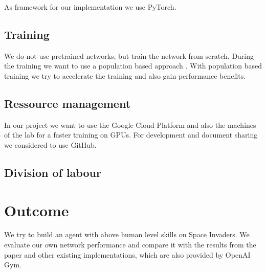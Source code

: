 \documentclass[10pt,twocolumn,letterpaper]{article}
\begin{document}
As framework for our implementation we use PyTorch.

\subsection{Training}
We do not use pretrained networks, but train the network from scratch. During the training we want to use a population based approach \cite{Jaderberg2017}. With population based training we try to accelerate the training and also gain performance benefits.

\subsection{Ressource management}
In our project we want to use the Google Cloud Platform and also the machines of the lab for a faster training on GPUs. For development and document sharing we considered to use GitHub.



%

\subsection{Division of labour}

\section{Outcome}
    We try to build an agent with above human level skills on Space Invaders. We evaluate our own network performance and compare it with the results from the paper and other existing implementations, which are also provided by OpenAI Gym.
    
{\small


}
\end{document}
